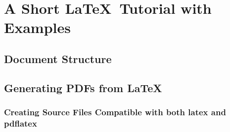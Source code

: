 

\chapter{A Short \LaTeX\ Tutorial with Examples}\label{cha:a_short_latex_tutorial_with_examples}

\section{Document Structure}\label{sec:document_structure}

\section{Generating PDFs from \LaTeX}\label{sec:generating_pdfs_from_latex}

\subsection{Creating Source Files Compatible with both latex and pdflatex}\label{ssec:creating_source_files_compatible_with_both_latex_and_pdflatex}

 
